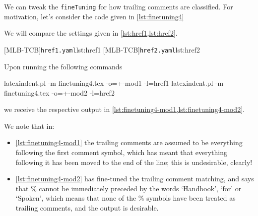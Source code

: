  \begin{example}
 We can tweak the \texttt{fineTuning} for how trailing comments are classified. For
 motivation, let's consider the code given in \cref{lst:finetuning4}


 We will compare the settings given in \cref{lst:href1,lst:href2}.

 \begin{cmhtcbraster}[raster column skip=.01\linewidth,
   raster left skip=0cm,
   raster right skip=-0.5cm,]
  [MLB-TCB]{\texttt{href1.yaml}}{lst:href1}
  [MLB-TCB]{\texttt{href2.yaml}}{lst:href2}
 \end{cmhtcbraster}

 Upon running the following commands

 \begin{commandshell}
latexindent.pl -m finetuning4.tex -o=+-mod1 -l=href1
latexindent.pl -m finetuning4.tex -o=+-mod2 -l=href2
\end{commandshell}

 we receive the respective output in \cref{lst:finetuning4-mod1,lst:finetuning4-mod2}.

 \begin{widepage}

 \end{widepage}

 We note that in:
 \begin{itemize}
  \item \cref{lst:finetuning4-mod1} the trailing comments are assumed to be everything following
        the first comment symbol, which has meant that everything following it has been moved to
        the end of the line; this is undesirable, clearly!
  \item \cref{lst:finetuning4-mod2} has fine-tuned the trailing comment matching, and says that
        \% cannot
        be immediately preceded by the words `Handbook', `for' or `Spoken', which means that
        none of the \% symbols have been treated as trailing comments, and the output is
        desirable.
 \end{itemize}
 \end{example}

